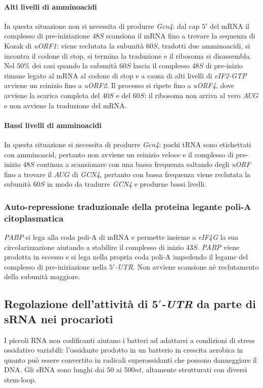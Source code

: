 \paragraph{Alti livelli di amminoacidi}
In questa situazione non si necessita di produrre \emph{Gcn4}: dal cap $5'$ del mRNA il complesso di pre-iniziazione $48S$ scansiona il mRNA fino a trovare la sequenza di Kozak di \emph{uORF1}: viene
reclutata la subunit\`a $60S$, tradotti due amminoacidi, si incontra il codone di stop, si termina la traduzione e il ribosoma si disassembla. Nel $50\%$ dei casi quando la subunit\`a $60S$ lascia il
complesso $48S$ di pre-inizio rimane legato al mRNA al codone di stop e a causa di alti livelli di \emph{eIF2-GTP} avviene un reinizio fino a \emph{uORF2}. Il processo si ripete fino a \emph{uORF4}, 
dove avviene la scarica completa del $40S$ e del $60S$: il ribosoma non arriva al vero $AUG$ e non avviene la traduzione del mRNA. 
\paragraph{Bassi livelli di amminoacidi}
In questa situazione si necessita di produrre \emph{Gcn4}: pochi tRNA sono etichettati con amminoacid, pertanto non avviene un reinizio veloce e il complesso di pre-inizio $48S$ continua a scansionare con
una bassa frequenza saltando degli \emph{uORF} fino a trovare il $AUG$ di \emph{GCN4}, pertanto con bassa frequenza viene reclutata la subunit\`a $60S$ in modo da tradurre \emph{GCN4} e produrne bassi
livelli. 
\subsubsection{Auto-repressione traduzionale della proteina legante poli-A citoplasmatica}
\emph{PABP} si lega alla coda poli-A di mRNA e permette insieme a \emph{eIF4G} la sua circolarizzazione aiutando a stabilire il complesso di inizio $43S$. \emph{PABP} viene prodotta in eccesso e si lega
nella propria coda poli-A impedendo il legame del complesso di pre-iniziazione nella \emph{$5'$-UTR}. Non avviene scansione n\`e reclutamento della subunit\`a maggiore.
\subsection{Regolazione dell'attivit\`a di \emph{$\mathbf{5'}$-UTR} da parte di sRNA nei procarioti}
I piccoli RNA non codificanti aiutano i batteri ad adattarsi a condizioni di stress ossidativo variabili: l'ossidante \emph{} prodotto in un batterio in crescita aerobica in quanto pu\`o essere
convertito in radicali superossidanti che possono danneggiare il DNA. Gli sRNA sono lunghi dai $50$ ai $500nt$, altamente strutturati con diversi stem-loop. 
